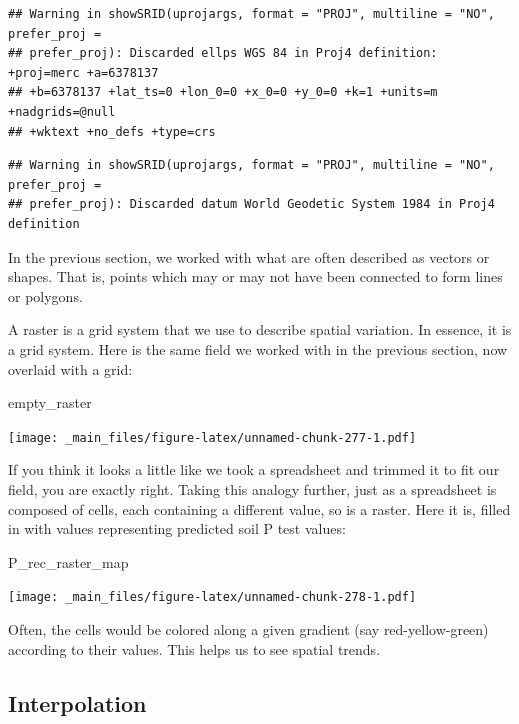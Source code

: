 \documentclass[
]{book}
\newenvironment{Shaded}{\begin{snugshade}}{\end{snugshade}}
\newcommand{\NormalTok}[1]{#1}
\begin{document}
\begin{verbatim}
## Warning in showSRID(uprojargs, format = "PROJ", multiline = "NO", prefer_proj =
## prefer_proj): Discarded ellps WGS 84 in Proj4 definition: +proj=merc +a=6378137
## +b=6378137 +lat_ts=0 +lon_0=0 +x_0=0 +y_0=0 +k=1 +units=m +nadgrids=@null
## +wktext +no_defs +type=crs
\end{verbatim}

\begin{verbatim}
## Warning in showSRID(uprojargs, format = "PROJ", multiline = "NO", prefer_proj =
## prefer_proj): Discarded datum World Geodetic System 1984 in Proj4 definition
\end{verbatim}

In the previous section, we worked with what are often described as vectors or shapes. That is, points which may or may not have been connected to form lines or polygons.

A raster is a grid system that we use to describe spatial variation. In essence, it is a grid system. Here is the same field we worked with in the previous section, now overlaid with a grid:

\begin{Shaded}
\begin{Highlighting}[]
\NormalTok{empty\_raster}
\end{Highlighting}
\end{Shaded}

\texttt{[image: \_main\_files/figure-latex/unnamed-chunk-277-1.pdf]}

If you think it looks a little like we took a spreadsheet and trimmed it to fit our field, you are exactly right. Taking this analogy further, just as a spreadsheet is composed of cells, each containing a different value, so is a raster. Here it is, filled in with values representing predicted soil P test values:

\begin{Shaded}
\begin{Highlighting}[]
\NormalTok{P\_rec\_raster\_map}
\end{Highlighting}
\end{Shaded}

\texttt{[image: \_main\_files/figure-latex/unnamed-chunk-278-1.pdf]}

Often, the cells would be colored along a given gradient (say red-yellow-green) according to their values. This helps us to see spatial trends.

\hypertarget{interpolation}{%
\subsection{Interpolation}\label{interpolation}}
\end{document}
